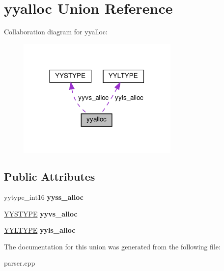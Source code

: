\hypertarget{unionyyalloc}{}\section{yyalloc Union Reference}
\label{unionyyalloc}


Collaboration diagram for yyalloc\+:
\nopagebreak
\begin{figure}[H]
\begin{center}
\leavevmode
\includegraphics[width=224pt]{unionyyalloc__coll__graph}
\end{center}
\end{figure}
\subsection*{Public Attributes}
\begin{DoxyCompactItemize}
\item 
\mbox{\label{unionyyalloc_a4800e0520a89a4789afa7b5d82197e65}} 
yytype\+\_\+int16 {\bfseries yyss\+\_\+alloc}
\item 
\mbox{\label{unionyyalloc_a9326f4fdc6f737a929444427836d8928}} 
\hyperlink{unionYYSTYPE}{Y\+Y\+S\+T\+Y\+PE} {\bfseries yyvs\+\_\+alloc}
\item 
\mbox{\label{unionyyalloc_a542e43248e6afac9af342c2f4e3162fc}} 
\hyperlink{structYYLTYPE}{Y\+Y\+L\+T\+Y\+PE} {\bfseries yyls\+\_\+alloc}
\end{DoxyCompactItemize}


The documentation for this union was generated from the following file\+:\begin{DoxyCompactItemize}
\item 
parser.\+cpp\end{DoxyCompactItemize}
